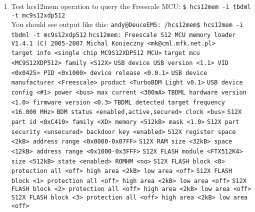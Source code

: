 \documentclass[12pt,notitlepage,onecolumn,oneside,openany]{memoir}
\begin{document}
\begin{enumerate}
\item \textsf{Test hcs12mem operation to query the Freescale MCU:} \newline
      \texttt{\$ hcs12mem -i tbdml -t mc9s12xdp512} \newline
      \\
      \textsf{You should see output like this:} \newline
      \texttt{andy@DeuceEMS:~/hcs12mem\$ hcs12mem -i tbdml -t mc9s12xdp512} \newline
      \texttt{hcs12mem: Freescale S12 MCU memory loader V1.4.1 (C) 2005-2007 Michal Konieczny 	<mk@cml.mfk.net.pl>} \newline
      \\
      \texttt{target info <single chip MC9S12XDP512 MCU>} \newline
      \texttt{target mcu <MC9S12XDP512> family <S12X>} \newline
      \texttt{USB device USB version <1.1> VID <0x0425> PID <0x1000> device release <0.0.1>} \newline
      \texttt{USB device manufacturer <Freescale> product <TurboBDM Light v0.1>} \newline
      \texttt{USB device config <\#1> power <bus> max current <300mA>} \newline
      \texttt{TBDML hardware version <1.0> firmware version <0.3>} \newline
      \texttt{TBDML detected target frequency <16.000 MHz>} \newline
      \texttt{BDM status <enabled,active,secured> clock <bus>} \newline
      \texttt{S12X part id <0xC410> family <XD> memory <512kB> mask <1.0>} \newline
      \texttt{S12X part security <unsecured> backdoor key <enabled>} \newline
      \texttt{S12X register space <2kB> address range <0x0000-0x07FF>} \newline
      \texttt{S12X RAM size <32kB> space <12kB> address range <0x1000-0x3FFF>} \newline
      \texttt{S12X FLASH module <FTX512K4> size <512kB> state <enabled> ROMHM <no>} \newline
      \texttt{S12X FLASH block <0> protection all <off> high area <2kB> low area <off>} \newline
      \texttt{S12X FLASH block <1> protection all <off> high area <2kB> low area <off>} \newline
      \texttt{S12X FLASH block <2> protection all <off> high area <2kB> low area <off>} \newline
      \texttt{S12X FLASH block <3> protection all <off> high area <2kB> low area <off>} \newline


\end{enumerate}
\end{document}
